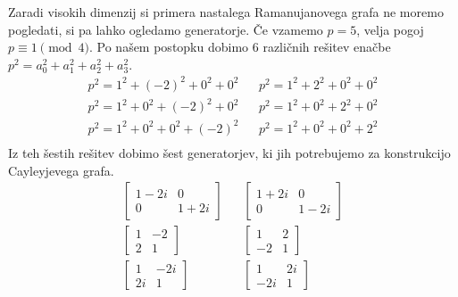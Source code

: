 \begin{primer}
    Zaradi visokih dimenzij si primera nastalega Ramanujanovega grafa ne moremo pogledati, si pa lahko ogledamo generatorje. Če vzamemo \(p=5\), velja pogoj \(p \equiv 1 \pmod 4\). Po našem postopku dobimo \(6\) različnih rešitev enačbe \(p^2 = a_0^2 + a_1^2 + a_2^2 + a_3^2\).
    \begin{align*}
        p^2 = 1^2 + (-2)^2 + 0^2 + 0^2 && p^2 = 1^2 + 2^2 + 0^2 + 0^2 \\
        p^2 = 1^2 + 0^2 + (-2)^2 + 0^2 && p^2 = 1^2 + 0^2 + 2^2 + 0^2 \\
        p^2 = 1^2 + 0^2 + 0^2 + (-2)^2 && p^2 = 1^2 + 0^2 + 0^2 + 2^2 \\
    \end{align*}
    Iz teh šestih rešitev dobimo šest generatorjev, ki jih potrebujemo za konstrukcijo Cayleyjevega grafa.
    \begin{align*}
        \begin{bmatrix}
            1-2i & 0 \\
            0 & 1+2i
        \end{bmatrix} &&
        \begin{bmatrix}
            1+2i & 0 \\
            0 & 1-2i
        \end{bmatrix} \\
        \begin{bmatrix}
            1 & -2 \\
            2 & 1
        \end{bmatrix} &&
        \begin{bmatrix}
            1 & 2 \\
            -2 & 1
        \end{bmatrix} \\
        \begin{bmatrix}
            1 & -2i \\
            2i & 1
        \end{bmatrix} &&
        \begin{bmatrix}
            1 & 2i \\
            -2i & 1
        \end{bmatrix}
    \end{align*}
\end{primer}

